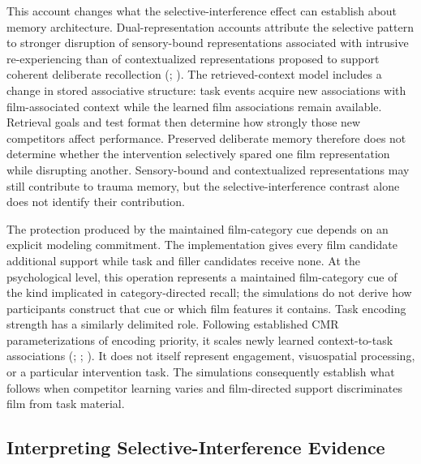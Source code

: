\documentclass[
  man,
  floatsintext,
  longtable,
  nolmodern,
  notxfonts,
  notimes,
  draftfirst,
  colorlinks=true,linkcolor=blue,citecolor=blue,urlcolor=blue]{apa7}
\begin{document}
This account changes what the selective-interference effect can
establish about memory architecture. Dual-representation accounts
attribute the selective pattern to stronger disruption of sensory-bound
representations associated with intrusive re-experiencing than of
contextualized representations proposed to support coherent deliberate
recollection (;
). The retrieved-context
model includes a change in stored associative structure: task events
acquire new associations with film-associated context while the learned
film associations remain available. Retrieval goals and test format then
determine how strongly those new competitors affect performance.
Preserved deliberate memory therefore does not determine whether the
intervention selectively spared one film representation while disrupting
another. Sensory-bound and contextualized representations may still
contribute to trauma memory, but the selective-interference contrast
alone does not identify their contribution.

The protection produced by the maintained film-category cue depends on
an explicit modeling commitment. The implementation gives every film
candidate additional support while task and filler candidates receive
none. At the psychological level, this operation represents a maintained
film-category cue of the kind implicated in category-directed recall;
the simulations do not derive how participants construct that cue or
which film features it contains. Task encoding strength has a similarly
delimited role. Following established CMR parameterizations of encoding
priority, it scales newly learned context-to-task associations
(;
;
). It does not
itself represent engagement, visuospatial processing, or a particular
intervention task. The simulations consequently establish what follows
when competitor learning varies and film-directed support discriminates
film from task material.

\subsection{Interpreting Selective-Interference
Evidence}\label{interpreting-selective-interference-evidence}
\end{document}
